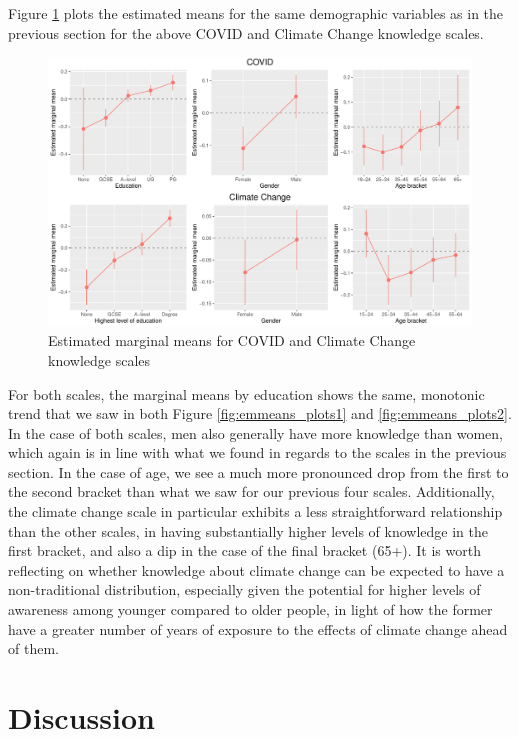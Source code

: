 \documentclass[11pt,halfline,a4paper,]{ouparticle}
\begin{document}
Figure \ref{fig:emmeans_plots4} plots the estimated means for the same
demographic variables as in the previous section for the above COVID and
Climate Change knowledge scales.

\begin{figure}[!h]
\includegraphics[width=1\linewidth]{Revisiting-the-Measurement-and-Dimensionality-of-Political-Knowledge--Evidence-from-Seven-European-Countries_files/figure-latex/emmeans_plots4-1} \caption{Estimated marginal means for COVID and Climate Change knowledge scales}\label{fig:emmeans_plots4}
\end{figure}

For both scales, the marginal means by education shows the same,
monotonic trend that we saw in both Figure \ref{fig:emmeans_plots1} and
\ref{fig:emmeans_plots2}. In the case of both scales, men also generally
have more knowledge than women, which again is in line with what we
found in regards to the scales in the previous section. In the case of
age, we see a much more pronounced drop from the first to the second
bracket than what we saw for our previous four scales. Additionally, the
climate change scale in particular exhibits a less straightforward
relationship than the other scales, in having substantially higher
levels of knowledge in the first bracket, and also a dip in the case of
the final bracket (65+). It is worth reflecting on whether knowledge
about climate change can be expected to have a non-traditional
distribution, especially given the potential for higher levels of
awareness among younger compared to older people, in light of how the
former have a greater number of years of exposure to the effects of
climate change ahead of them.

\hypertarget{discussion}{%
\section{Discussion}\label{discussion}}
\end{document}
